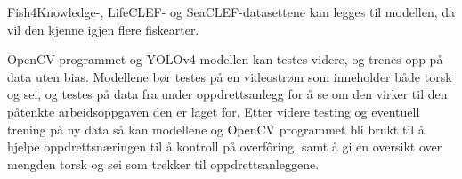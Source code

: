 Fish4Knowledge-, LifeCLEF- og SeaCLEF-datasettene kan legges til modellen, da vil den kjenne igjen flere fiskearter.

OpenCV-programmet og YOLOv4-modellen kan testes videre, og trenes opp på data uten bias. Modellene bør testes på en videostrøm som inneholder både torsk og sei, og testes på data fra under oppdrettsanlegg for å se om den virker til den påtenkte arbeidsoppgaven den er laget for. Etter videre testing og eventuell trening på ny data så kan modellene og OpenCV programmet bli brukt til å hjelpe oppdrettsnæringen til å kontroll på overfôring, samt å gi en oversikt over mengden torsk og sei som trekker til oppdrettsanleggene.

